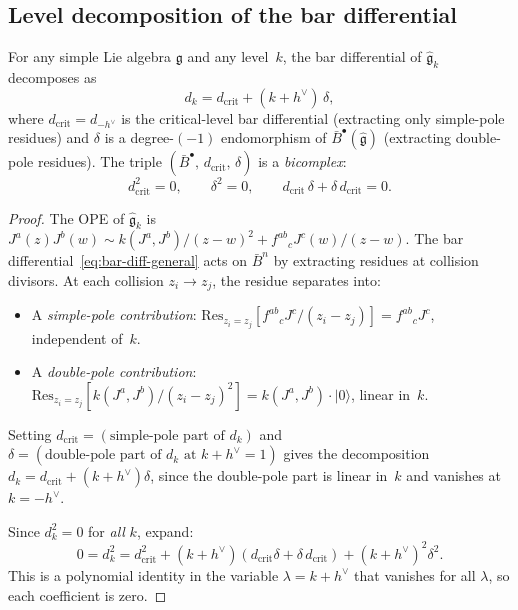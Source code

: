 \subsection{Level decomposition of the bar differential}

\begin{theorem}
\label{thm:km-bar-bicomplex}
For any simple Lie algebra $\mathfrak{g}$ and any level~$k$, the bar
differential of $\widehat{\mathfrak{g}}_k$ decomposes as
\begin{equation}\label{eq:bar-level-decomp}
d_k = d_{\mathrm{crit}} + (k + h^\vee)\,\delta,
\end{equation}
where $d_{\mathrm{crit}} = d_{-h^\vee}$ is the critical-level bar
differential \textup{(}extracting only simple-pole residues\textup{)} and
$\delta$ is a degree-$(-1)$ endomorphism of
$\bar{B}^{\bullet}(\widehat{\mathfrak{g}})$ \textup{(}extracting
double-pole residues\textup{)}.  The triple
$(\bar{B}^\bullet,\, d_{\mathrm{crit}},\, \delta)$ is a
\emph{bicomplex}:
\begin{equation}\label{eq:bar-bicomplex-conditions}
d_{\mathrm{crit}}^2 = 0, \qquad
\delta^2 = 0, \qquad
d_{\mathrm{crit}}\,\delta + \delta\, d_{\mathrm{crit}} = 0.
\end{equation}
\end{theorem}

\begin{proof}
The OPE of $\widehat{\mathfrak{g}}_k$ is
$J^a(z) J^b(w) \sim k(J^a, J^b)/(z-w)^2 + f^{ab}{}_c J^c(w)/(z-w)$.
The bar differential~\eqref{eq:bar-diff-general}
acts on $\bar{B}^n$ by extracting residues at collision
divisors.  At each collision $z_i \to z_j$, the residue
separates into:
\begin{itemize}
\item A \emph{simple-pole contribution}:
$\mathrm{Res}_{z_i = z_j}[f^{ab}{}_c J^c / (z_i - z_j)]
= f^{ab}{}_c J^c$, independent of~$k$.
\item A \emph{double-pole contribution}:
$\mathrm{Res}_{z_i = z_j}[k(J^a, J^b) / (z_i - z_j)^2]
= k(J^a, J^b) \cdot |0\rangle$, linear in~$k$.
\end{itemize}
Setting $d_{\mathrm{crit}} = (\text{simple-pole part of } d_k)$
and $\delta = (\text{double-pole part of } d_k \text{ at }
k + h^\vee = 1)$ gives the decomposition
$d_k = d_{\mathrm{crit}} + (k + h^\vee)\delta$, since the
double-pole part is linear in~$k$ and vanishes at
$k = -h^\vee$.

Since $d_k^2 = 0$ for \emph{all} $k$, expand:
\[
0 = d_k^2
= d_{\mathrm{crit}}^2
+ (k + h^\vee)(d_{\mathrm{crit}}\delta + \delta\, d_{\mathrm{crit}})
+ (k + h^\vee)^2 \delta^2.
\]
This is a polynomial identity in the variable
$\lambda = k + h^\vee$ that vanishes for all $\lambda$,
so each coefficient is zero.
\end{proof}

